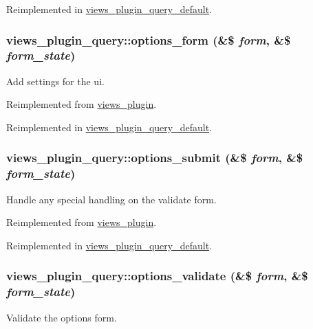 Reimplemented in \hyperlink{classviews__plugin__query__default_af724e9bdf8dc76ae3956c3ffa5b43d71}{views\_\-plugin\_\-query\_\-default}.\hypertarget{classviews__plugin__query_a9d5e25ce4c997a4e341ef3c3a464736a}{
\subsubsection[{options\_\-form}]{\setlength{\rightskip}{0pt plus 5cm}views\_\-plugin\_\-query::options\_\-form (\&\$ {\em form}, \/  \&\$ {\em form\_\-state})}}
\label{classviews__plugin__query_a9d5e25ce4c997a4e341ef3c3a464736a}
Add settings for the ui. 

Reimplemented from \hyperlink{classviews__plugin_a1aaed8da1afd9f45293a37358c159837}{views\_\-plugin}.

Reimplemented in \hyperlink{classviews__plugin__query__default_ab34cb54bf886643b1d16dc73f8ff78dc}{views\_\-plugin\_\-query\_\-default}.\hypertarget{classviews__plugin__query_adf4a74ae9fba5fbbc9a742b5b4947437}{
\subsubsection[{options\_\-submit}]{\setlength{\rightskip}{0pt plus 5cm}views\_\-plugin\_\-query::options\_\-submit (\&\$ {\em form}, \/  \&\$ {\em form\_\-state})}}
\label{classviews__plugin__query_adf4a74ae9fba5fbbc9a742b5b4947437}
Handle any special handling on the validate form. 

Reimplemented from \hyperlink{classviews__plugin_a442b0f392deb52725ec8159e05654e06}{views\_\-plugin}.

Reimplemented in \hyperlink{classviews__plugin__query__default_aac79abee5640db26687e1794097e0798}{views\_\-plugin\_\-query\_\-default}.\hypertarget{classviews__plugin__query_ad40827dad9fa00e8a1ff57d8a8d979de}{
\subsubsection[{options\_\-validate}]{\setlength{\rightskip}{0pt plus 5cm}views\_\-plugin\_\-query::options\_\-validate (\&\$ {\em form}, \/  \&\$ {\em form\_\-state})}}
\label{classviews__plugin__query_ad40827dad9fa00e8a1ff57d8a8d979de}
Validate the options form. 

